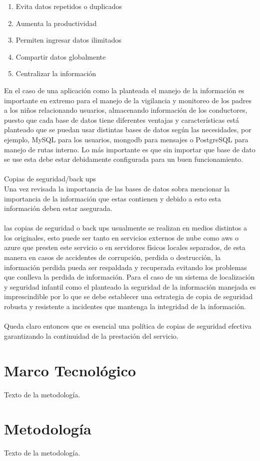 \documentclass[12pt,onehalfspacing]{report}
\begin{document}
\begin{enumerate}
    \item Evita datos repetidos o duplicados
    \item Aumenta la productividad
    \item Permiten ingresar datos ilimitados
    \item Compartir datos globalmente
    \item Centralizar la información
\end{enumerate}
En el caso de una aplicación como la planteada el manejo de la información es importante en extremo para el manejo de la vigilancia y monitoreo de los padres a los niños relacionando usuarios, almacenando información de los conductores, puesto que cada base de datos tiene diferentes ventajas y características está planteado que se puedan usar distintas bases de datos según las necesidades, por ejemplo, MySQL para los usuarios, mongodb para mensajes o PostgreSQL para manejo de rutas interno. Lo más importante es que sin importar que base de dato se use esta debe estar debidamente configurada para un buen funcionamiento.\\\\
Copias de seguridad/back ups\\
Una vez revisada la importancia de las bases de datos sobra mencionar la importancia de la información que estas contienen y debido a esto esta información deben estar asegurada.\\\\
las copias de seguridad o back ups usualmente se realizan en medios distintos a los originales, esto puede ser tanto en servicios externos de nube como aws o azure que presten este servicio o en servidores físicos locales separados, de esta manera en casos de accidentes de corrupción, perdida o destrucción, la información perdida pueda ser respaldada y recuperada evitando los problemas que conlleva la perdida de información.
Para el caso de un sistema de localización y seguridad infantil como el planteado la seguridad de la información manejada es imprescindible por lo que se debe establecer una estrategia de copia de seguridad robusta y resistente a incidentes que mantenga la integridad de la información.\\\\Queda claro entonces que es esencial una política de copias de seguridad efectiva garantizando la continuidad de la prestación del servicio.


\section{Marco Tecnológico }
Texto de la metodología.

\section{Metodología}
Texto de la metodología.



\end{document}
